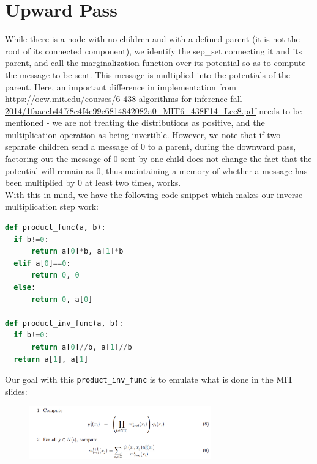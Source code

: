 \documentclass{article}
\begin{document}
\section{Upward Pass}
While there is a node with no children and with a defined parent (it is not the root of its connected component), we identify the sep\_set connecting it and its parent, and call the marginalization function over its potential so as to compute the message to be sent. This message is multiplied into the potentials of the parent. Here, an important difference in implementation from \url{https://ocw.mit.edu/courses/6-438-algorithms-for-inference-fall-2014/1faaccb44f78c4f4e99c6814842082a0_MIT6_438F14_Lec8.pdf} needs to be mentioned - we are not treating the distributions as positive, and the multiplication operation as being invertible. However, we note that if two separate children send a message of 0 to a parent, during the downward pass, factoring out the message of 0 sent by one child does not change the fact that the potential will remain as 0, thus maintaining a memory of whether a message has been multiplied by 0 at least two times, works.\\
With this in mind, we have the following code snippet which makes our inverse-multiplication step work:
\begin{lstlisting}[language=Python]
  def product_func(a, b):
  if b!=0:
      return a[0]*b, a[1]*b
  elif a[0]==0:
      return 0, 0
  else:
      return 0, a[0]

def product_inv_func(a, b):
  if b!=0:
      return a[0]//b, a[1]//b
  return a[1], a[1]
\end{lstlisting}
Our goal with this \texttt{product\_inv\_func} is to emulate what is done in the MIT slides:
\begin{figure}[H]
  \includegraphics[width=0.7\textwidth]{Slides_Eq89.png}
\end{figure}
\end{document}
